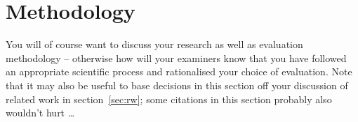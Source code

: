 
\section{Methodology}
\label{sec:Methodology}

You will of course want to discuss your research as well as evaluation methodology -- otherwise how will your examiners know that you have followed an appropriate scientific process and rationalised your choice of evaluation. Note that it may also be useful to base decisions in this section off your discussion of related work in section~\ref{sec:rw}; some citations in this section probably also wouldn't hurt \dots